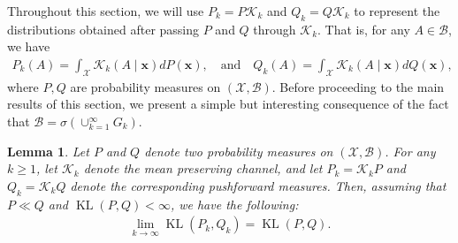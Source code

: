 \documentclass{article}
\theoremstyle{plain}
\newtheorem{lemma}[lemma]{Lemma}
\theoremstyle{definition}
\newcommand{\lrp}[1]{\left( #1 \right)}
\newcommand{\KL}{\operatorname{KL}}
\newcommand{\calX}{\mathcal X}
\newcommand{\calB}{\mathcal B}
\newcommand{\calK}{\mathcal{K}}
\newcommand{\xvec}{\mathbf{x}}
\newcommand{\qtext}[1]{\quad \text{#1} \quad}
\begin{document}
Throughout this section, we will use $P_k = P \calK_k $ and $Q_k = Q \calK_k $ to represent the distributions obtained after passing $P$ and $Q$ through $\calK_k$. That is, for any $A \in \calB$, we have 
\begin{align}
   P_k(A) = \int_{\calX} \calK_k(A \mid \xvec) dP(\xvec), \qtext{and} Q_k(A) = \int_{\calX} \calK_k(A \mid \xvec) dQ(\xvec),
\end{align}
where $P, Q$ are probability measures on $(\calX, \calB)$. Before proceeding to the main results of this section, we present a simple but interesting consequence of the fact that $\calB = \sigma \lrp{\cup_{k=1}^\infty G_k}$. 
\begin{lemma}
    \label{lemma:convergence-of-KL} 
    Let $P$ and $Q$ denote two probability measures on $(\calX, \calB)$. 
    For any $k \geq 1$, let $\calK_k$ denote the mean preserving channel, and  let $P_k = \calK_k P$ and $Q_k = \calK_k Q$ denote the corresponding pushforward measures. Then, assuming that $P \ll Q$ and $\KL(P, Q) < \infty$,  we have the following: 
    \begin{align}
        \lim_{k \to \infty} \KL(P_k, Q_k) = \KL(P, Q). 
    \end{align}
\end{lemma}
\end{document}
